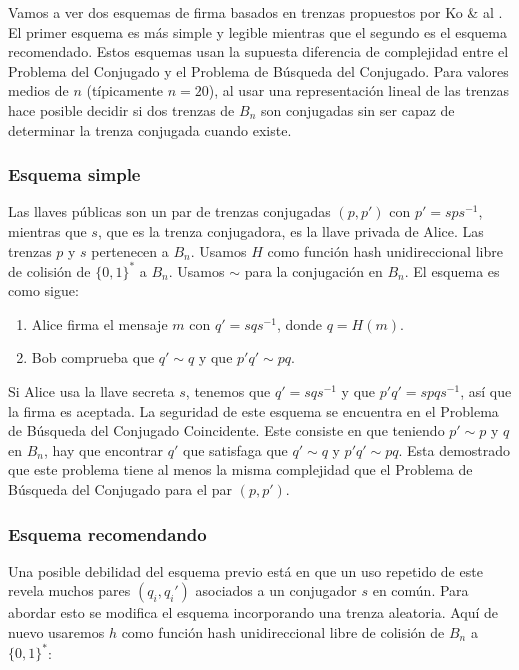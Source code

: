 \documentclass[12pt]{book}
\theoremstyle{definition}
\begin{document}
Vamos a ver dos esquemas de firma basados en trenzas propuestos por Ko \& al \cite{Ko_sig}. El primer esquema es más simple y legible mientras que el segundo es el esquema recomendado. Estos esquemas usan la supuesta diferencia de complejidad entre el Problema del Conjugado y el Problema de Búsqueda del Conjugado. Para valores medios de $n$ (típicamente $n=20$), al usar una representación lineal de las trenzas hace posible decidir si dos trenzas de $B_n$ son conjugadas sin ser capaz de determinar la trenza conjugada cuando existe.

\subsubsection*{Esquema simple}
Las llaves públicas son un par de trenzas conjugadas $(p,p')$ con $p'=sps^{-1}$, mientras que $s$, que es la trenza conjugadora, es la llave privada de Alice. Las trenzas $p$ y $s$ pertenecen a $B_n$. Usamos $H$ como función hash unidireccional libre de colisión de $\{0,1\}^*$ a $B_n$. Usamos $\sim$ para la conjugación en $B_n$. El esquema es como sigue:


\begin{enumerate}
\item Alice firma el mensaje $m$ con $q'=sqs^{-1}$, donde $q=H(m)$.
\item Bob comprueba que $q'\sim q$ y que $p'q'\sim pq$.
\end{enumerate}

Si Alice usa la llave secreta $s$, tenemos que $q'=sqs^{-1}$ y que $p'q'=spqs^{-1}$, así que la firma es aceptada. La seguridad de este esquema se encuentra en el Problema de Búsqueda del Conjugado Coincidente. Este consiste en que teniendo $p'\sim p$ y $q$ en $B_n$, hay que encontrar $q'$ que satisfaga que $q'\sim q$ y $p'q'\sim pq$. Esta demostrado que este problema tiene al menos la misma complejidad que el Problema de Búsqueda del Conjugado para el par $(p,p')$.

\subsubsection*{Esquema recomendando}
Una posible debilidad del esquema previo está en que un uso repetido de este revela muchos pares $(q_i,q_i')$ asociados a un conjugador $s$ en común. Para abordar esto se modifica el esquema incorporando una trenza aleatoria. Aquí de nuevo usaremos $h$ como función hash unidireccional libre de colisión de $B_n$ a $\{0,1\}^*$:
\end{document}

